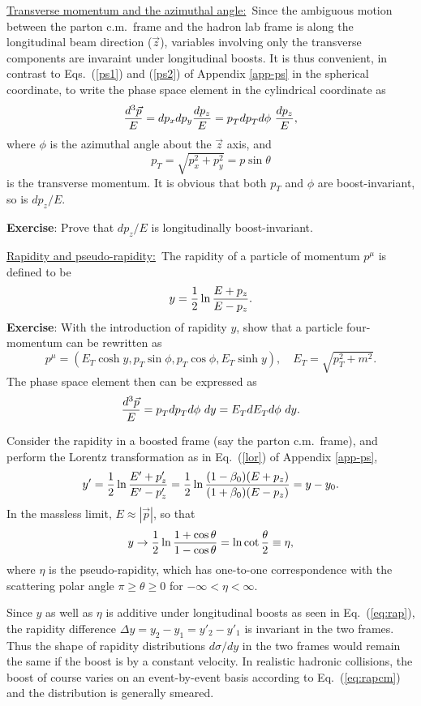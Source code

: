 \documentclass[12pt,prd,aps,floats,preprintnumbers,preprint,superscriptaddress,floatfix,nofootinbib]{revtex4}
\def\vp{{\vec p}}
\def\pt{p_T^{}}
\def\et{E_T^{}}
\def\be{\begin{equation}}
\def\ee{\end{equation}}
\begin{document}
\vskip 0.2cm
\noindent
\underline{Transverse momentum and the azimuthal angle:}\  Since the 
ambiguous motion between the parton c.m.~frame and the 
hadron lab frame is along
the longitudinal beam direction ($\vec z$), variables involving only
the transverse components are invaraint under longitudinal  boosts. It is thus
convenient, in contrast to Eqs.~(\ref{ps1})  and (\ref{ps2}) of Appendix \ref{app-ps} 
in the spherical coordinate,
 to write the phase space element in the cylindrical coordinate as
\be
{d^3\vec p\over E} = d p_x d p_y {d p_z\over E}  =  \pt d\pt d\phi\  {d p_z\over E} ,
\ee
where $\phi$ is the azimuthal angle about the $\vec z$ axis, and 
\be
\pt = \sqrt{p_x^2 + p_y^2} = p \sin\theta
\ee
 is the transverse momentum. It is obvious
that both $\pt$ and $\phi$ are  boost-invariant, so is $dp_z/E$.

\noindent
{{\bf Exercise}: Prove that $dp_z/E$ is longitudinally boost-invariant.}


\vskip 0.2cm
\noindent
\underline{Rapidity and pseudo-rapidity:}\  The rapidity of  a particle of momentum
$p^\mu$ is defined to be
\be
y = {1\over 2} \ln{E+p_z \over E - p_z }.
\ee
{{\bf Exercise}: With the introduction of  rapidity $y$, show that a particle 
four-momentum can be rewritten as 
\be
p^\mu=(E_T \cosh y, \pt \sin\phi, \pt \cos \phi, E_T\sinh y),\quad \et=\sqrt{p_T^2+m^2} .
\ee
The phase space element then can be expressed as
\be
{d^3\vec p\over E}  =  \pt d\pt d\phi\  dy =  \et d\et d\phi\  dy.
\ee  }

Consider the rapidity in a boosted frame (say the parton c.m.~frame), and
perform the Lorentz transformation as in Eq.~(\ref{lor}) of 
Appendix \ref{app-ps},
\be
y' = {1\over 2} \ln{E'+p'_z \over E' - p'_z } = 
{1\over 2}\ln{(1-\beta_0) (E+p_z) \over (1+\beta_0)(E - p_z) } = y - y_0.
\label{eq:rap}
\ee
In the massless limit, $E\approx |\vp|$, so that 
\be
y \to  {1\over 2} \ln{1+\cos\theta \over 1 - \cos\theta }= \ln{\cot {\theta \over 2} } \equiv \eta ,
\ee
where $\eta$ is the pseudo-rapidity, which has one-to-one correspondence with
the scattering polar angle $\pi \ge \theta\ge 0$ for $-\infty < \eta < \infty$. 

Since $y$ as well as $\eta$ is additive under longitudinal boosts as seen in 
Eq.~(\ref{eq:rap}), the rapidity difference 
$\Delta y= y_2 - y_1 = y'_2 - y'_1$ is invariant in the two frames. Thus the shape 
of  rapidity distributions $d\sigma/dy$ 
in the two frames would remain the same
if the boost is by a constant velocity. In realistic hadronic collisions, the boost
 of course varies on an event-by-event basis according to Eq.~(\ref{eq:rapcm})
 and the distribution is generally  smeared.
\end{document}
